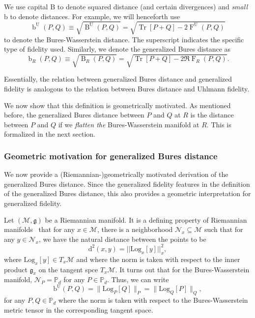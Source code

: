 \documentclass[12pt]{article}
\theoremstyle{definition}
\def \Log {\mathrm{Log}}
\begin{document}
We use capital $\mathrm{B}$ to denote squared distance (and certain divergences) and \textit{small} $\mathrm{b}$ to denote distances. For example, we will henceforth use
\begin{equation}
     \operatorname{b}^\mathrm{U}(P,Q) \equiv \sqrt{\operatorname{B}^\mathrm U(P,Q) } = \sqrt{\operatorname{Tr}[P+Q] - 2\operatorname{F}^\mathrm U(P,Q) }
\end{equation}
to denote the Bures-Wasserstein distance. The superscript indicates the specific type of fidelity used. Similarly, we denote the generalized Bures distance as
\begin{equation}
     \operatorname{b}_R(P,Q) \equiv \sqrt{\operatorname{B}_R(P,Q) } = \sqrt{\operatorname{Tr}[P+Q] - 2 \Re \operatorname{F}_R(P,Q)}.
\end{equation}
 
Essentially, the relation between generalized Bures distance and generalized fidelity is analogous to the relation between Bures distance and Uhlmann fidelity. 

We now show that this definition is geometrically motivated. As mentioned before, the generalized Bures distance between $P$ and $Q$ at $R$ is the distance between $P$ and $Q$ if we \textit{flatten the} Bures-Wasserstein manifold at $R$. This is formalized in the next section. 

\subsubsection{Geometric motivation for generalized Bures distance}
We now provide a (Riemannian-)geometrically motivated derivation of the generalized Bures distance. Since the generalized fidelity features in the definition of the generalized Bures distance, this also provides a geometric interpretation for generalized fidelity. 

Let $(\mathcal M, \mathfrak{g})$ be a Riemannian manifold. It is a defining property of Riemannian manifolds~\cite{do1992riemannian} that for any $x \in \mathcal M$, there is a neighborhood $\mathcal N_x \subseteq \mathcal M$ such that for any $y \in \mathcal N_x$, we have the natural distance between the points to be
\begin{equation}
    \mathrm{d}^2(x,y) = || \mathrm{Log}_x[y] ||_x^2,
\end{equation}
where $\Log_x[y] \in T_x \mathcal M$ and where the norm is taken with respect to the inner product $\mathfrak g_x$ on the tangent spce $T_x \mathcal M$. It turns out that for the Bures-Wasserstein manifold, $\mathcal N_P = \mathbb P_d$ for any $P \in \mathbb P_d $. Thus, we can write
\begin{equation}
    \mathrm{b}^\mathrm{U}(P,Q) =  \| \mathrm{Log}_P[Q] \|_P = \| \mathrm{Log}_Q[P] \|_Q, 
\end{equation}
for any $P, Q \in \mathbb P_d$ where the norm is taken with respect to the Bures-Wasserstein metric tensor in the corresponding tangent space.
\end{document}
